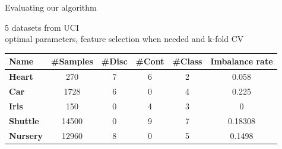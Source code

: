 \documentclass[english]{beamer}
\begin{document}
\begin{frame}{Evaluating our algorithm}
	\begin{block}{}
		5 datasets from UCI \\
		optimal parameters, feature selection when needed and k-fold CV
	\end{block}
\begin{adjustwidth}{-0.4cm}{}
	\begin{table}
			\begin{tabular}{l|ccccc}
				\textbf{Name}    & \multicolumn{1}{l}{\textbf{\#Samples}} & \multicolumn{1}{l}{\textbf{\#Disc}} & \multicolumn{1}{l}{\textbf{\#Cont}} & \multicolumn{1}{l}{\textbf{\#Class}} & \multicolumn{1}{l}{\textbf{Imbalance rate}} \\ \hline
				\textbf{Heart}   & 270                                    & 7                                   & 6                                   & 2                                      & 0.058                                       \\
				\textbf{Car}     & 1728                                   & 6                                   & 0                                   & 4                                      & 0.225                                       \\
				\textbf{Iris}    & 150                                    & 0                                   & 4                                   & 3                                      & 0                                           \\
				\textbf{Shuttle} & 14500                                  & 0                                   & 9                                   & 7                                      & 0.18308                                     \\
				\textbf{Nursery} & 12960                                  & 8                                   & 0                                   & 5                                      & 0.1498      
			\end{tabular}
		\end{table}
	\end{adjustwidth}
\end{frame}
%
\end{document}
